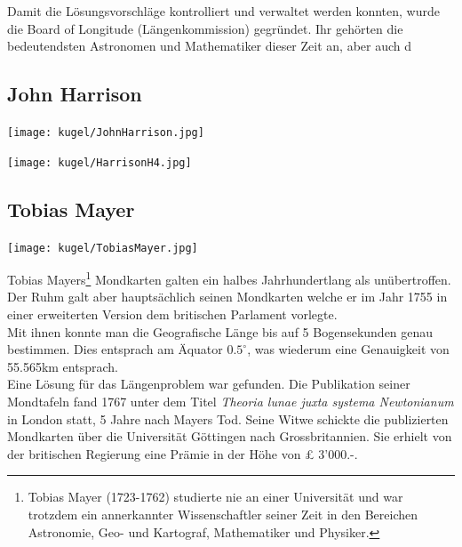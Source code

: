 \begin{refsection}
Damit die Lösungsvorschläge kontrolliert und verwaltet werden konnten, wurde die Board of Longitude (Längenkommission) gegründet. Ihr gehörten die bedeutendsten Astronomen und Mathematiker dieser Zeit an, aber auch d



\subsection{John Harrison}

\begin{center}
        \texttt{[image: kugel/JohnHarrison.jpg]}
\end{center}





\begin{center}
        \texttt{[image: kugel/HarrisonH4.jpg]}
\end{center}


\subsection{Tobias Mayer}

\begin{center}
        \texttt{[image: kugel/TobiasMayer.jpg]}
\end{center}

Tobias Mayers\footnote{%
Tobias Mayer (1723-1762) studierte nie an einer Universität und war trotzdem ein annerkannter Wissenschaftler seiner Zeit in den Bereichen Astronomie, Geo- und Kartograf, Mathematiker und Physiker.} 
 Mondkarten galten ein halbes Jahrhundertlang als unübertroffen. Der Ruhm galt aber hauptsächlich seinen Mondkarten welche er im Jahr 1755 in einer erweiterten Version dem britischen Parlament vorlegte.\\
Mit ihnen konnte man die Geografische Länge bis auf 5 Bogensekunden genau bestimmen. Dies entsprach am Äquator $0.5 ^{\circ}$, was wiederum eine Genauigkeit von 55.565km entsprach.\\
Eine Lösung für das Längenproblem war gefunden. Die Publikation seiner Mondtafeln fand 1767 unter dem Titel \textit{Theoria lunae juxta systema Newtonianum} in London statt, 5 Jahre nach Mayers Tod. 
Seine Witwe schickte die publizierten Mondkarten über die Universität Göttingen nach Grossbritannien. Sie erhielt von der britischen Regierung eine Prämie in der Höhe von £ 3’000.-.


\end{refsection}
